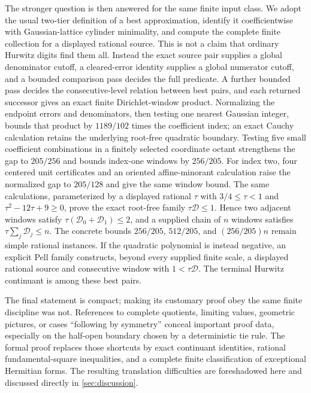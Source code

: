 \documentclass[11pt]{article}
\begin{document}
The stronger question is then answered for the same finite input class.  We
adopt the usual two-tier definition of a best approximation, identify it
coefficientwise with Gaussian-lattice cylinder minimality, and compute the
complete finite collection for a displayed rational source.  This is not a
claim that ordinary Hurwitz digits find them all.  Instead the exact source
pair supplies a global denominator cutoff, a cleared-error identity supplies
a global numerator cutoff, and a bounded comparison pass decides the full
predicate.  A further bounded pass decides the consecutive-level relation
between best pairs, and each returned successor gives an exact finite
Dirichlet-window product.  Normalizing the endpoint errors and denominators,
then testing one nearest Gaussian integer, bounds that product by $1189/102$
times the coefficient index; an exact Cauchy calculation retains the
underlying root-free quadratic boundary.  Testing five small coefficient
combinations in a finitely selected coordinate octant strengthens the gap to
$205/256$ and bounds index-one windows by $256/205$.  For index two, four
centered unit certificates and an oriented affine-minorant calculation raise
the normalized gap to $205/128$ and give the same window bound.  The
same calculations, parameterized by a displayed rational $\tau$ with
$3/4\le\tau<1$ and $\tau^2-12\tau+9\ge0$, prove the exact root-free family
$\tau\mathcal D\le1$.  Hence two adjacent windows satisfy
$\tau(\mathcal D_0+\mathcal D_1)\le2$, and a supplied chain of $n$ windows
satisfies $\tau\sum_j\mathcal D_j\le n$.  The concrete bounds $256/205$,
$512/205$, and $(256/205)n$ remain simple rational instances.  If the
quadratic polynomial is instead negative, an explicit Pell family constructs,
beyond every supplied finite scale, a displayed rational source and
consecutive window with $1<\tau\mathcal D$.  The terminal Hurwitz continuant
is among these best pairs.

The final statement is compact; making its customary proof obey the same
finite discipline was not.  References to complete quotients, limiting
values, geometric pictures, or cases ``following by symmetry'' conceal
important proof data, especially on the half-open boundary chosen by a
deterministic tie rule.  The formal proof replaces those shortcuts by exact
continuant identities, rational fundamental-square inequalities, and a
complete finite classification of exceptional Hermitian forms.  The
resulting translation difficulties are foreshadowed here and discussed
directly in \cref{sec:discussion}.
\end{document}
